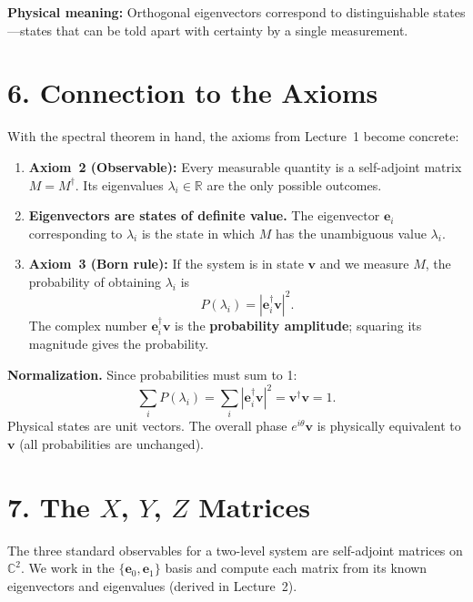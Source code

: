 \documentclass[12pt,a4paper]{article}
\begin{document}
\medskip
\noindent\textbf{Physical meaning:} Orthogonal eigenvectors correspond to distinguishable states---states that can be told apart with certainty by a single measurement.

\section{6. Connection to the Axioms}

With the spectral theorem in hand, the axioms from Lecture~1 become concrete:

\begin{enumerate}[nosep]
    \item \textbf{Axiom~2 (Observable):} Every measurable quantity is a self-adjoint matrix $M = M^\dagger$.  Its eigenvalues $\lambda_i \in \mathbb{R}$ are the only possible outcomes.
    \item \textbf{Eigenvectors are states of definite value.}  The eigenvector $\mathbf{e}_i$ corresponding to $\lambda_i$ is the state in which $M$ has the unambiguous value $\lambda_i$.
    \item \textbf{Axiom~3 (Born rule):} If the system is in state $\mathbf{v}$ and we measure $M$, the probability of obtaining $\lambda_i$ is
    \[
        P(\lambda_i) = |\mathbf{e}_i^\dagger\mathbf{v}|^2.
    \]
    The complex number $\mathbf{e}_i^\dagger\mathbf{v}$ is the \textbf{probability amplitude}; squaring its magnitude gives the probability.
\end{enumerate}

\noindent\textbf{Normalization.}  Since probabilities must sum to 1:
\[
    \sum_i P(\lambda_i) = \sum_i |\mathbf{e}_i^\dagger\mathbf{v}|^2 = \mathbf{v}^\dagger\mathbf{v} = 1.
\]
Physical states are unit vectors.  The overall phase $e^{i\theta}\mathbf{v}$ is physically equivalent to $\mathbf{v}$ (all probabilities are unchanged).

\section{7. The $X$, $Y$, $Z$ Matrices}

The three standard observables for a two-level system are self-adjoint matrices on $\mathbb{C}^2$.  We work in the $\{\mathbf{e}_0,\mathbf{e}_1\}$ basis and compute each matrix from its known eigenvectors and eigenvalues (derived in Lecture~2).
\end{document}
